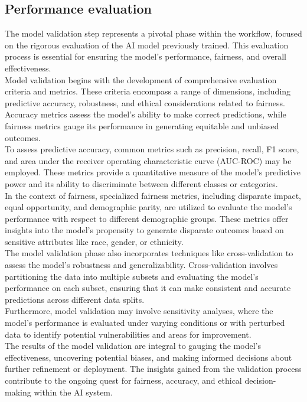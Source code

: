 \documentclass[12pt,a4paper,openright,twoside]{book}
\begin{document}
\subsection{Performance evaluation}
The model validation step represents a pivotal phase within the workflow, focused on the rigorous evaluation of the AI model previously trained. This evaluation process is essential for ensuring the model's performance, fairness, and overall effectiveness. \\
Model validation begins with the development of comprehensive evaluation criteria and metrics. These criteria encompass a range of dimensions, including predictive accuracy, robustness, and ethical considerations related to fairness. Accuracy metrics assess the model's ability to make correct predictions, while fairness metrics gauge its performance in generating equitable and unbiased outcomes. \\
To assess predictive accuracy, common metrics such as precision, recall, F1 score, and area under the receiver operating characteristic curve (AUC-ROC) may be employed. These metrics provide a quantitative measure of the model's predictive power and its ability to discriminate between different classes or categories. \\
In the context of fairness, specialized fairness metrics, including disparate impact, equal opportunity, and demographic parity, are utilized to evaluate the model's performance with respect to different demographic groups. These metrics offer insights into the model's propensity to generate disparate outcomes based on sensitive attributes like race, gender, or ethnicity. \\
The model validation phase also incorporates techniques like cross-validation to assess the model's robustness and generalizability. Cross-validation involves partitioning the data into multiple subsets and evaluating the model's performance on each subset, ensuring that it can make consistent and accurate predictions across different data splits. \\
Furthermore, model validation may involve sensitivity analyses, where the model's performance is evaluated under varying conditions or with perturbed data to identify potential vulnerabilities and areas for improvement. \\
The results of the model validation are integral to gauging the model's effectiveness, uncovering potential biases, and making informed decisions about further refinement or deployment. The insights gained from the validation process contribute to the ongoing quest for fairness, accuracy, and ethical decision-making within the AI system. \\
\end{document}
